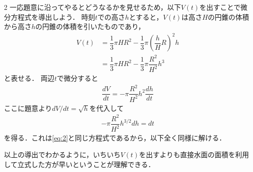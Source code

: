 \documentclass[../../main.tex]{subfiles}
\begin{document}
\begin{multicols}{2}
  一応題意に沿ってやるとどうなるかを見せるため，以下$V(t)$を出すことで微分方程式を導出しよう．
  時刻$t$での高さ$h$とすると，$V(t)$は高さ$H$の円錐の体積から高さ$h$の円錐の体積を引いたものであり，
  \begin{align}
    V(t)
    & = \dfrac{1}{3} \pi H R^2 - \dfrac{1}{3} \pi \left(\dfrac{h}{H}R\right)^2 h \\
    & = \dfrac{1}{3} \pi H R^2 - \dfrac{1}{3} \pi \dfrac{R^2}{H^2} h^3
  \end{align}
  と表せる．
  両辺$t$で微分すると
  \begin{align}
    \dfrac{dV}{dt} = -\pi \dfrac{R^2}{H^2} h^2 \dfrac{dh}{dt}
  \end{align}
  ここに題意より$dV/dt=\sqrt{h}$を代入して
  \begin{align}
    -\pi \dfrac{R^2}{H^2} h^{3/2} dh = dt
  \end{align}
  を得る．これは\cref{eq:2}と同じ方程式であるから，以下全く同様に解ける．

  以上の導出でわかるように，いちいち$V(t)$を出すよりも直接水面の面積を利用して立式した方が早いということが理解できる．
  \newpage
\end{multicols}
\end{document}

